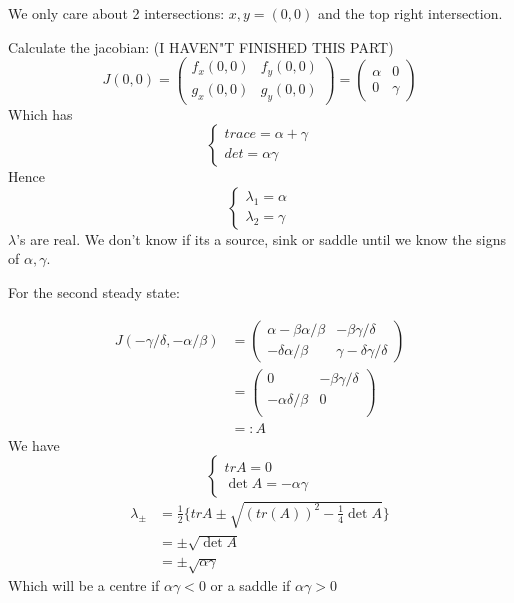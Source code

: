 \documentclass{X:/Documents/Coding/Latex/myassignment}
\begin{document}
\begin{figure}[h]
\centering
{}
\end{figure}
We only care about 2 intersections: $x,y = (0,0)$ and the top right intersection.

Calculate the jacobian:
(I HAVEN"T FINISHED THIS PART)
\[J(0,0) = \begin{pmatrix}
    f_x(0,0)& f_y(0,0)\\
    g_x(0,0)&g_y(0,0)
\end{pmatrix} = \begin{pmatrix}
    \alpha&0\\ 0&\gamma
\end{pmatrix}\]
Which has 
\[\begin{cases}
    trace = \alpha + \gamma\\
    det = \alpha\gamma
\end{cases}\]
Hence 
\[\begin{cases}
    \lambda_1 = \alpha \\
    \lambda_2 = \gamma
\end{cases}\]
$\lambda$'s are real. We don't know if its a source, sink or saddle until we know the signs of $\alpha,\gamma$.


For the second steady state:

\begin{align*}
    J(-\gamma/\delta, -\alpha/\beta) &= \begin{pmatrix}
        \alpha - \beta \alpha/\beta & -\beta \gamma/\delta\\
        -\delta \alpha/\beta & \gamma - \delta \gamma/\delta
    \end{pmatrix}\\
    &= \begin{pmatrix}
        0 & -\beta \gamma/\delta\\
        - \alpha \delta/\beta & 0 \\
    \end{pmatrix}\\
    &=: A
\end{align*}
We have
\[\begin{cases}
    tr A = 0\\
    \det A = - \alpha \gamma
\end{cases}\]
\begin{align*}
    \lambda_{\pm} &= \frac12\{trA \pm \sqrt{(tr(A))^2 - \frac14 \det A}\}\\
    &=\pm \sqrt{\det A}\\
    &= \pm \sqrt{\alpha \gamma}
\end{align*}
Which will be a centre if $\alpha\gamma < 0$ or a saddle if $\alpha\gamma >0$
\end{document}

